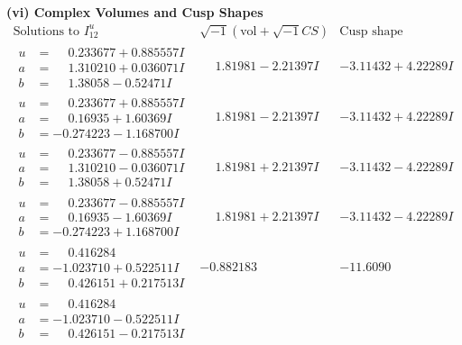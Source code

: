 \documentclass[1p]{elsarticle_modified}
\theoremstyle{definition}
\newcommand{\I}{\sqrt{-1}}
\begin{document}
\newpage\flushleft \textbf{(vi) Complex Volumes and Cusp Shapes}
$$\begin{array}{c|c|c}  
\text{Solutions to }I^u_{12}& \I (\text{vol} + \sqrt{-1}CS) & \text{Cusp shape}\\
 \hline 
\begin{aligned}
u &= \phantom{-}0.233677 + 0.885557 I \\
a &= \phantom{-}1.310210 + 0.036071 I \\
b &= \phantom{-}1.38058 - 0.52471 I\end{aligned}
 & \phantom{-}1.81981 - 2.21397 I & -3.11432 + 4.22289 I \\ \hline\begin{aligned}
u &= \phantom{-}0.233677 + 0.885557 I \\
a &= \phantom{-}0.16935 + 1.60369 I \\
b &= -0.274223 - 1.168700 I\end{aligned}
 & \phantom{-}1.81981 - 2.21397 I & -3.11432 + 4.22289 I \\ \hline\begin{aligned}
u &= \phantom{-}0.233677 - 0.885557 I \\
a &= \phantom{-}1.310210 - 0.036071 I \\
b &= \phantom{-}1.38058 + 0.52471 I\end{aligned}
 & \phantom{-}1.81981 + 2.21397 I & -3.11432 - 4.22289 I \\ \hline\begin{aligned}
u &= \phantom{-}0.233677 - 0.885557 I \\
a &= \phantom{-}0.16935 - 1.60369 I \\
b &= -0.274223 + 1.168700 I\end{aligned}
 & \phantom{-}1.81981 + 2.21397 I & -3.11432 - 4.22289 I \\ \hline\begin{aligned}
u &= \phantom{-}0.416284\phantom{ +0.000000I} \\
a &= -1.023710 + 0.522511 I \\
b &= \phantom{-}0.426151 + 0.217513 I\end{aligned}
 & -0.882183\phantom{ +0.000000I} & -11.6090\phantom{ +0.000000I} \\ \hline\begin{aligned}
u &= \phantom{-}0.416284\phantom{ +0.000000I} \\
a &= -1.023710 - 0.522511 I \\
b &= \phantom{-}0.426151 - 0.217513 I\end{aligned}

\end{array}$$
\end{document}
